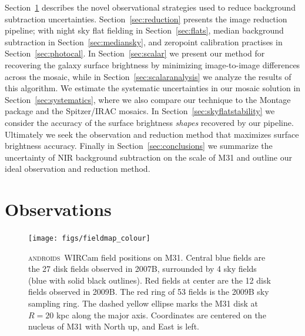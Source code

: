 \documentclass[iop]{emulateapj}
\newcommand{\androids}{\textsc{androids}}
\begin{document}
Section~\ref{sec:Observations} describes the novel observational strategies used to reduce background subtraction uncertainties.
Section~\ref{sec:reduction} presents the image reduction pipeline; with night sky flat fielding in Section~\ref{sec:flats}, median background subtraction in Section~\ref{sec:mediansky}, and zeropoint calibration practises in Section~\ref{sec:photocal}.
In Section~\ref{sec:scalar} we present our method for recovering the galaxy surface brightness by minimizing image-to-image differences across the mosaic, while in Section~\ref{sec:scalaranalysis} we analyze the results of this algorithm.
We estimate the systematic uncertainties in our mosaic solution in Section~\ref{sec:systematics}, where we also compare our technique to the Montage package \citep{Berriman:2008} and the Spitzer/IRAC mosaics.
In Section~\ref{sec:skyflatstability} we consider the accuracy of the surface brightness \emph{shapes} recovered by our pipeline.
Ultimately we seek the observation and reduction method that maximizes surface brightness accuracy.
Finally in Section~\ref{sec:conclusions} we summarize the uncertainty of NIR background subtraction on the scale of M31 and outline our ideal observation and reduction method.

\section{Observations}
\label{sec:Observations}

\begin{figure}[t]
\centering
\texttt{[image: figs/fieldmap\_colour]}
\caption{\androids\ WIRCam field positions on M31.
Central blue fields are the 27 disk fields observed in 2007B, surrounded by 4 sky fields (blue with solid black outlines).
Red fields at center are the 12 disk fields observed in 2009B.
The red ring of 53 fields is the 2009B sky sampling ring.
The dashed yellow ellipse marks the M31 disk at $R=20$ kpc along the major axis.
Coordinates are centered on the nucleus of M31 with North up, and East is left.}
\label{fig:fieldmap}
\end{figure}

\end{document}
